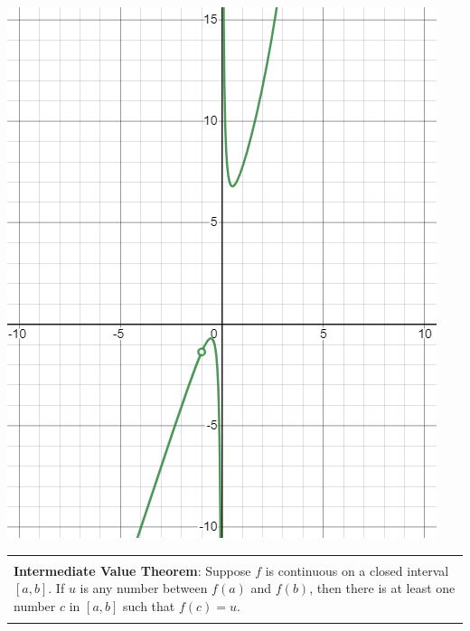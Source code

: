 \documentclass[12pt]{report}
\newenvironment{boxe}
    {\begin{center}
    \begin{tabular}{|p{0.9\textwidth}|}
    \hline\\
    }
    { 
    \\\\\hline
    \end{tabular} 
    \end{center}
    }
\begin{document}
\begin{enumerate}
\includegraphics[scale=0.5]{contivtexplot.png} \\



\end{enumerate} 
 \begin{boxe}
\textbf{Intermediate Value Theorem}: Suppose $f$ is continuous on a closed interval $[a,b]$. If $u$ is any number between $f(a)$ and $f(b)$, then there is at least one number $c$ in $[a,b]$ such that $f(c)=u$.
\end{boxe}
\end{document}
